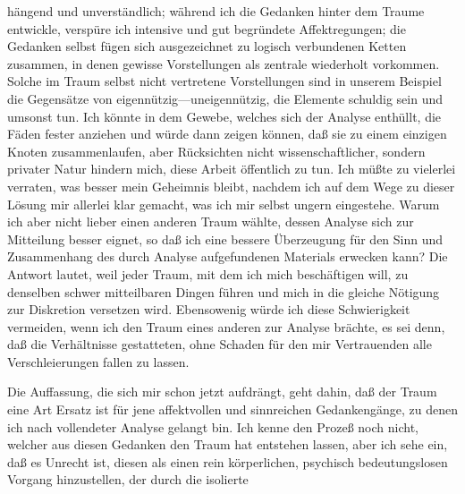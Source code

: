 \documentclass{article}
\begin{document}
         
            
            
            
        \pstart
        hängend und unverständlich; während ich die Gedanken hinter dem
               Traume entwickle, verspüre ich intensive und gut begründete Affektregungen; die
               Gedanken selbst fügen sich ausgezeichnet zu logisch verbundenen
               Ketten zusammen, in denen gewisse Vorstellungen als zentrale wiederholt
               vorkommen. Solche im Traum selbst nicht vertretene Vorstellungen sind in
               unserem Beispiel die Gegensätze von eigennützig—uneigennützig, die Elemente
                  schuldig sein und umsonst tun. Ich könnte in dem Gewebe, welches sich der Analyse
               enthüllt, die Fäden fester anziehen und würde dann zeigen können, daß sie zu
               einem einzigen Knoten zusammenlaufen, aber Rücksichten nicht wissenschaftlicher, sondern privater Natur hindern mich, diese Arbeit
               öffentlich zu tun. Ich müßte zu vielerlei verraten, was besser mein Geheimnis
               bleibt, nachdem ich auf dem Wege zu dieser Lösung mir allerlei klar gemacht, was
               ich mir selbst ungern eingestehe. Warum ich aber nicht lieber einen
               anderen Traum wählte, dessen Analyse sich zur Mitteilung besser eignet, so
               daß ich eine bessere Überzeugung für den Sinn und Zusammenhang des durch
               Analyse aufgefundenen Materials erwecken kann? Die Antwort lautet, weil jeder Traum, mit dem ich mich beschäftigen will,
               zu denselben schwer mitteilbaren Dingen führen und mich in die gleiche Nötigung
               zur Diskretion versetzen wird. Ebensowenig würde ich diese
               Schwierigkeit vermeiden, wenn ich den Traum eines anderen zur Analyse brächte,
               es sei denn, daß die Verhältnisse gestatteten, ohne Schaden für den mir
               Vertrauenden alle Verschleierungen fallen zu lassen.
        \pend
    
            
        \pstart
        Die Auffassung, die sich mir schon jetzt aufdrängt, geht dahin, daß der Traum
               eine Art Ersatz ist für jene affektvollen und
               sinnreichen Gedankengänge, zu denen ich nach vollendeter Analyse gelangt bin.
               Ich kenne den Prozeß noch nicht, welcher aus diesen Gedanken den Traum hat
               entstehen lassen, aber ich sehe ein, daß es Unrecht ist, diesen als einen rein
               körperlichen, psychisch bedeutungslosen Vorgang hinzustellen, der durch die
               isolierte
        \pend
    
\end{document}
